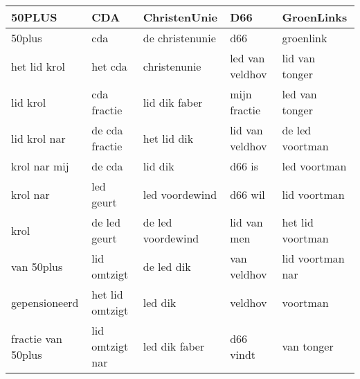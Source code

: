 \begin{tabular}{lllll}
\toprule
             50PLUS &              CDA &       ChristenUnie &              D66 &        GroenLinks \\
\midrule
             50plus &              cda &    de christenunie &              d66 &         groenlink \\
       het lid krol &          het cda &       christenunie &  led van veldhov &    lid van tonger \\
           lid krol &      cda fractie &      lid dik faber &     mijn fractie &    led van tonger \\
       lid krol nar &   de cda fractie &        het lid dik &  lid van veldhov &   de led voortman \\
       krol nar mij &           de cda &            lid dik &           d66 is &      led voortman \\
           krol nar &        led geurt &     led voordewind &          d66 wil &      lid voortman \\
               krol &     de led geurt &  de led voordewind &      lid van men &  het lid voortman \\
         van 50plus &      lid omtzigt &         de led dik &      van veldhov &  lid voortman nar \\
      gepensioneerd &  het lid omtzigt &            led dik &          veldhov &          voortman \\
 fractie van 50plus &  lid omtzigt nar &      led dik faber &        d66 vindt &        van tonger \\
\bottomrule
\end{tabular}
